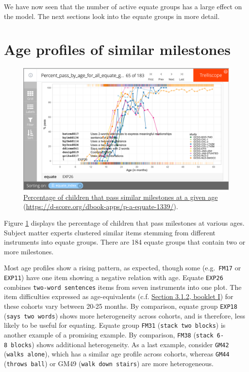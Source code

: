\documentclass[
]{book}
\begin{document}
We have now seen that the number of active equate groups has a large effect on the model. The next sections look into the equate groups in more detail.

\hypertarget{sec:ageprofiles}{%
\section{Age profiles of similar milestones}\label{sec:ageprofiles}}

\begin{figure}

{\centering \includegraphics[width=1\linewidth]{fig/fig_5.3} 

}

\caption{\href{https://d-score.org/dbook-apps/p-a-equate-1339/\#display=Percent_pass_by_age_for_all_equate_groups\&nrow=1\&ncol=1\&arr=row\&pg=65\&labels=equate\&sort=equate_index;asc\&filter=\&sidebar=\&fv=}{Percentage of children that pass similar milestones at a given age} (\url{https://d-score.org/dbook-apps/p-a-equate-1339/}).}\label{fig:p-a-equate-1339}
\end{figure}



Figure \ref{fig:p-a-equate-1339} displays the percentage of children that pass milestones at various ages. Subject matter experts clustered similar items stemming from different instruments into equate groups. There are 184 equate groups that contain two or more milestones.

Most age profiles show a rising pattern, as expected, though some (e.g.~\texttt{FM17} or \texttt{EXP11}) have one item showing a negative relation with age. Equate \texttt{EXP26} combines \texttt{two-word\ sentences} items from seven instruments into one plot. The item difficulties expressed as age-equivalents (c.f. \href{https://d-score.org/dbook1/sec-agebased.html\#sec:ageequivalent}{Section 3.1.2, booklet I}) for these cohorts vary between 20-25 months. By comparison, equate group \texttt{EXP18} (\texttt{says\ two\ words}) shows more heterogeneity across cohorts, and is therefore, less likely to be useful for equating. Equate group \texttt{FM31} (\texttt{stack\ two\ blocks}) is another example of a promising example. By comparison, \texttt{FM38} (\texttt{stack\ 6-8\ blocks}) shows additional heterogeneity. As a last example, consider \texttt{GM42} (\texttt{walks\ alone}), which has a similar age profile across cohorts, whereas \texttt{GM44} (\texttt{throws\ ball}) or GM49 (\texttt{walk\ down\ stairs}) are more heterogeneous.
\end{document}
